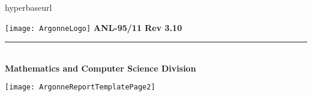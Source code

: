 %
%

hyperbaseurl

\makeindex

\def\design{\medskip \noindent Design Issue:\begin{em}}
\def\enddesign{\end{em} \medskip}


\def\shortintro{false}

\usepackage{fancyhdr,lastpage}
\pagestyle{fancy}





\pagestyle{empty}
\hspace{-.65in}\texttt{[image: ArgonneLogo]}
\hfill  {\large {\bf ANL-95/11 Rev 3.10}}

\vspace*{2in}
\vspace*{8pt}
\hrule
\vspace*{8pt}

\vspace*{1in}
\noindent \\
{\Large {\bf Mathematics and Computer Science Division}}

\vspace*{10pt}


\vspace*{20pt}



\newpage
{}
\centerline{\texttt{[image: ArgonneReportTemplatePage2]}}
\restoregeometry
\newpage


